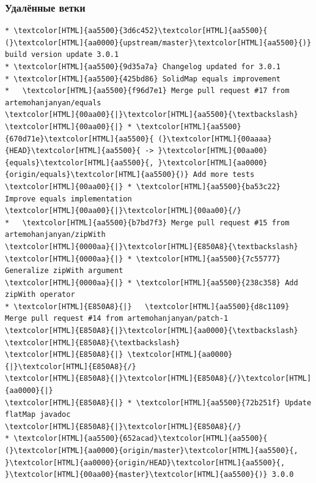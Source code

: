 \documentclass[pdf,russian,aspectratio=169]{beamer}
\begin{document}
\begin{frame}[fragile]
    \frametitle{Удалённые ветки}
    \begin{Verbatim}[commandchars=\\\{\},fontsize=\relsize{-2}]
* \textcolor[HTML]{aa5500}{3d6c452}\textcolor[HTML]{aa5500}{ (}\textcolor[HTML]{aa0000}{upstream/master}\textcolor[HTML]{aa5500}{)} build version update 3.0.1
* \textcolor[HTML]{aa5500}{9d35a7a} Changelog updated for 3.0.1
* \textcolor[HTML]{aa5500}{425bd86} SolidMap equals improvement
*   \textcolor[HTML]{aa5500}{f96d7e1} Merge pull request #17 from artemohanjanyan/equals
\textcolor[HTML]{00aa00}{|}\textcolor[HTML]{aa5500}{\textbackslash}  
\textcolor[HTML]{00aa00}{|} * \textcolor[HTML]{aa5500}{670d71e}\textcolor[HTML]{aa5500}{ (}\textcolor[HTML]{00aaaa}{HEAD}\textcolor[HTML]{aa5500}{ -> }\textcolor[HTML]{00aa00}{equals}\textcolor[HTML]{aa5500}{, }\textcolor[HTML]{aa0000}{origin/equals}\textcolor[HTML]{aa5500}{)} Add more tests
\textcolor[HTML]{00aa00}{|} * \textcolor[HTML]{aa5500}{ba53c22} Improve equals implementation
\textcolor[HTML]{00aa00}{|}\textcolor[HTML]{00aa00}{/}  
*   \textcolor[HTML]{aa5500}{b7bd7f3} Merge pull request #15 from artemohanjanyan/zipWith
\textcolor[HTML]{0000aa}{|}\textcolor[HTML]{E850A8}{\textbackslash}  
\textcolor[HTML]{0000aa}{|} * \textcolor[HTML]{aa5500}{7c55777} Generalize zipWith argument
\textcolor[HTML]{0000aa}{|} * \textcolor[HTML]{aa5500}{238c358} Add zipWith operator
* \textcolor[HTML]{E850A8}{|}   \textcolor[HTML]{aa5500}{d8c1109} Merge pull request #14 from artemohanjanyan/patch-1
\textcolor[HTML]{E850A8}{|}\textcolor[HTML]{aa0000}{\textbackslash} \textcolor[HTML]{E850A8}{\textbackslash}  
\textcolor[HTML]{E850A8}{|} \textcolor[HTML]{aa0000}{|}\textcolor[HTML]{E850A8}{/}  
\textcolor[HTML]{E850A8}{|}\textcolor[HTML]{E850A8}{/}\textcolor[HTML]{aa0000}{|}   
\textcolor[HTML]{E850A8}{|} * \textcolor[HTML]{aa5500}{72b251f} Update flatMap javadoc
\textcolor[HTML]{E850A8}{|}\textcolor[HTML]{E850A8}{/}  
* \textcolor[HTML]{aa5500}{652acad}\textcolor[HTML]{aa5500}{ (}\textcolor[HTML]{aa0000}{origin/master}\textcolor[HTML]{aa5500}{, }\textcolor[HTML]{aa0000}{origin/HEAD}\textcolor[HTML]{aa5500}{, }\textcolor[HTML]{00aa00}{master}\textcolor[HTML]{aa5500}{)} 3.0.0
    \end{Verbatim}
\end{frame}
\end{document}
